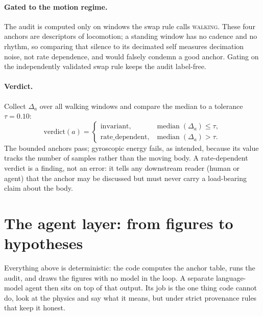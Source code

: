 \documentclass[11pt]{article}
\begin{document}
\paragraph{Gated to the motion regime.} The audit is computed only on windows the swap
rule calls \textsc{walking}. These four anchors are descriptors of locomotion; a standing
window has no cadence and no rhythm, so comparing that silence to its decimated self
measures decimation noise, not rate dependence, and would falsely condemn a good anchor.
Gating on the independently validated swap rule keeps the audit label-free.

\paragraph{Verdict.} Collect $\Delta_a$ over all walking windows and compare the median to
a tolerance $\tau = 0.10$:
\begin{equation}
\text{verdict}(a) =
\begin{cases}
\text{invariant}, & \operatorname{median}(\Delta_a) \leq \tau,\\[2pt]
\text{rate\_dependent}, & \operatorname{median}(\Delta_a) > \tau.
\end{cases}
\end{equation}
The bounded anchors pass; gyroscopic energy fails, as intended, because its value tracks
the number of samples rather than the moving body. A rate-dependent verdict is a finding,
not an error: it tells any downstream reader (human or agent) that the anchor may be
discussed but must never carry a load-bearing claim about the body.

\section{The agent layer: from figures to hypotheses}

Everything above is deterministic: the code computes the anchor table, runs the
audit, and draws the figures with no model in the loop. A separate language-model
agent then sits on top of that output. Its job is the one thing code cannot do, look
at the physics and say what it means, but under strict provenance rules that keep it
honest.
\end{document}
